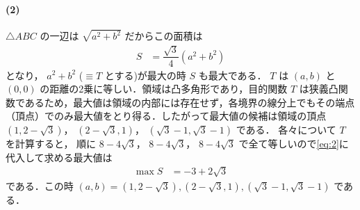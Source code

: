 \documentclass[../../main.tex]{subfiles}
\begin{document}
\paragraph{(2)}

$\triangle ABC$ の一辺は $\sqrt{a^2+b^2}$ だからこの面積は
\begin{align}
  S &= \dfrac{\sqrt{3}}{4}(a^2+b^2) \label{eq:2}
\end{align}
となり， $a^2+b^2$ ($\equiv T$ とする)が最大の時 $S$ も最大である．
$T$ は $(a,b)$ と $(0,0)$ の距離の2乗に等しい．領域は凸多角形であり，目的関数 $T$ は狭義凸関数であるため，最大値は領域の内部には存在せず，各境界の線分上でもその端点（頂点）でのみ最大値をとり得る．したがって最大値の候補は領域の頂点 $(1, 2-\sqrt{3})$， $(2-\sqrt{3}, 1)$， $(\sqrt{3}-1, \sqrt{3}-1)$ である．
各々について $T$ を計算すると， 順に $8-4\sqrt{3}$， $8-4\sqrt{3}$， $8-4\sqrt{3}$ で全て等しいので\cref{eq:2}に代入して求める最大値は
\begin{align}
  \max S &= -3 + 2\sqrt{3}
\end{align}
である．この時 $(a,b) = (1, 2-\sqrt{3}), (2-\sqrt{3}, 1), (\sqrt{3}-1, \sqrt{3}-1)$ である．

\newpage
\end{document}
